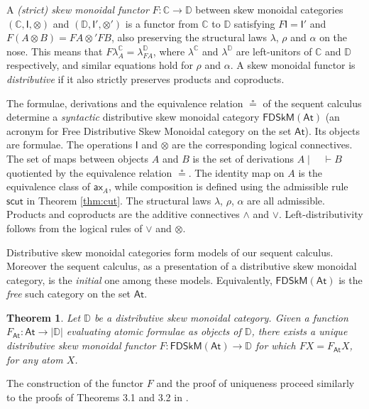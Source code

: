 \documentclass[submission,copyright,creativecommons]{eptcs}
\newtheorem{theorem}{Theorem}[section]
\theoremstyle{definition}
\newcommand{\ax}{\mathsf{ax}}
\newcommand{\ot}{\otimes}
\newcommand{\I}{\mathsf{I}}
\newcommand{\FSkMCC}{\mathsf{FDSkM}}
\begin{document}
A \emph{(strict) skew monoidal functor} $F : \mathbb{C} \rightarrow \mathbb{D}$ between skew monoidal categories $(\mathbb{C} , \I , \ot)$ and \linebreak$(\mathbb{D} , \I' , \ot')$ is a functor from $\mathbb{C}$ to $\mathbb{D}$ satisfying
    $F \I = \I'$ and $F (A \ot B) = F A \ot' F B$, also preserving the structural laws $\lambda$, $\rho$ and $\alpha$ on the nose. This means that $F \lambda_A^\mathbb{C} = \lambda_{FA}^\mathbb{D}$, where $\lambda^\mathbb{C}$ and $\lambda^\mathbb{D}$ are left-unitors of $\mathbb{C}$ and $\mathbb{D}$ respectively, and similar equations hold for $\rho$ and $\alpha$. A skew monoidal functor is \emph{distributive} if it also strictly preserves products and coproducts.

The formulae, derivations and the equivalence relation $\circeq$ of the sequent calculus determine a \emph{syntactic} distributive skew monoidal category $\FSkMCC(\mathsf{At})$ (an acronym for \textsf{F}ree \textsf{D}istributive \textsf{Sk}ew \textsf{M}onoidal category on the set $\mathsf{At}$). Its objects are formulae. The operations $\I$ and $\ot$ are the corresponding logical connectives. The set of maps between objects $A$ and $B$ is the set of derivations $A \mid \quad \vdash B$ quotiented by the equivalence relation $\circeq$. The identity map on $A$ is the equivalence class of $\ax_A$, while composition is defined using the admissible rule $\mathsf{scut}$ in Theorem \ref{thm:cut}. The structural laws $\lambda$, $\rho$, $\alpha$ are all admissible. Products and coproducts are the additive connectives $\land$ and $\lor$. Left-distributivity follows from the logical rules of $\lor$ and $\ot$.

Distributive skew monoidal categories form models of our sequent calculus.
Moreover the sequent calculus, as a presentation of a distributive skew monoidal category, is the \emph{initial} one among these
models. Equivalently, $\FSkMCC(\mathsf{At})$ is the \emph{free}
such category on the set $\mathsf{At}$.
\begin{theorem}\label{thm:models}
  Let $\mathbb{D}$ be a distributive skew monoidal category. Given a function $F_{\mathsf{At}} : \mathsf{At} \rightarrow |\mathbb{D}|$ evaluating atomic formulae as objects of $\mathbb{D}$, there exists a unique distributive skew monoidal functor \linebreak$F : \FSkMCC(\mathsf{At}) \rightarrow \mathbb{D}$ for which $F X = F_{\mathsf{At}} X$, for any atom $X$.
\end{theorem}
The construction of the functor $F$ and the proof of uniqueness proceed similarly to the proofs of Theorems 3.1 and 3.2 in \cite{UVW:protsn}.
\end{document}
